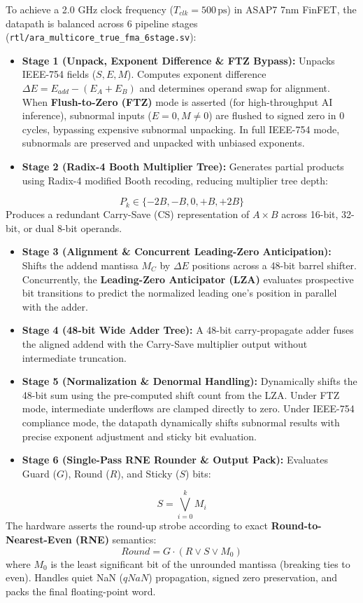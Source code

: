\documentclass[journal,10pt,twocolumn]{IEEEtran}
\begin{document}
To achieve a 2.0 GHz clock frequency ($T_{clk} = 500\,\text{ps}$) in ASAP7 7nm FinFET, the datapath is balanced across 6 pipeline stages (\texttt{rtl/ara\_multicore\_true\_fma\_6stage.sv}):
\begin{itemize}
  \item \textbf{Stage 1 (Unpack, Exponent Difference \& FTZ Bypass):} Unpacks IEEE-754 fields ($S, E, M$). Computes exponent difference $\Delta E = E_{add} - (E_A + E_B)$ and determines operand swap for alignment. When \textbf{Flush-to-Zero (FTZ)} mode is asserted (for high-throughput AI inference), subnormal inputs ($E = 0, M \ne 0$) are flushed to signed zero in 0 cycles, bypassing expensive subnormal unpacking. In full IEEE-754 mode, subnormals are preserved and unpacked with unbiased exponents.
  \item \textbf{Stage 2 (Radix-4 Booth Multiplier Tree):} Generates partial products using Radix-4 modified Booth recoding, reducing multiplier tree depth:
\end{itemize}
$$P_k \in \{-2B, -B, 0, +B, +2B\}$$
Produces a redundant Carry-Save (CS) representation of $A \times B$ across 16-bit, 32-bit, or dual 8-bit operands.
\begin{itemize}
  \item \textbf{Stage 3 (Alignment \& Concurrent Leading-Zero Anticipation):} Shifts the addend mantissa $M_C$ by $\Delta E$ positions across a 48-bit barrel shifter. Concurrently, the \textbf{Leading-Zero Anticipator (LZA)} evaluates prospective bit transitions to predict the normalized leading one's position in parallel with the adder.
  \item \textbf{Stage 4 (48-bit Wide Adder Tree):} A 48-bit carry-propagate adder fuses the aligned addend with the Carry-Save multiplier output without intermediate truncation.
  \item \textbf{Stage 5 (Normalization \& Denormal Handling):} Dynamically shifts the 48-bit sum using the pre-computed shift count from the LZA. Under FTZ mode, intermediate underflows are clamped directly to zero. Under IEEE-754 compliance mode, the datapath dynamically shifts subnormal results with precise exponent adjustment and sticky bit evaluation.
  \item \textbf{Stage 6 (Single-Pass RNE Rounder \& Output Pack):} Evaluates Guard ($G$), Round ($R$), and Sticky ($S$) bits:
\end{itemize}
$$S = \bigvee_{i=0}^{k} M_i$$
The hardware asserts the round-up strobe according to exact \textbf{Round-to-Nearest-Even (RNE)} semantics:
$$Round = G \cdot (R \vee S \vee M_0)$$
where $M_0$ is the least significant bit of the unrounded mantissa (breaking ties to even). Handles quiet NaN ($qNaN$) propagation, signed zero preservation, and packs the final floating-point word.
\end{document}
